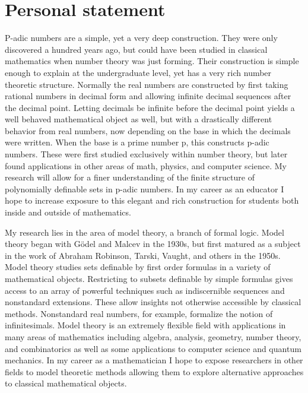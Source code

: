 \documentclass[11pt]{article}
\begin{document}
\section*{Personal statement}

P-adic numbers are a simple, yet a very deep construction. They were only discovered a hundred years ago, but could have been studied in classical mathematics when number theory was just forming. Their construction is simple enough to explain at the undergraduate level, yet has a very rich number theoretic structure. Normally the real numbers are constructed by first taking rational numbers in decimal form and allowing infinite decimal sequences after the decimal point. 
Letting decimals be infinite before the decimal point yields a well behaved mathematical object as well, but with a drastically different behavior from real numbers, now depending on the base in which the decimals were written. 
When the base is a prime number p, this constructs p-adic numbers. These were first studied exclusively within number theory, but later
			 found applications in other areas of math, 
			physics, and computer science. My research 
			will allow 
			for a finer understanding of the finite structure 
		of polynomially definable sets in p-adic numbers. 
			In my career as an educator I hope to increase exposure to this elegant and rich construction for students both inside and outside of mathematics.
		
	
My research lies in the area of model theory, a branch of formal logic. Model theory began with G\"odel and Malcev in the 1930s, but first matured as a subject in the work of Abraham Robinson, Tarski, Vaught, and others in the 1950s. Model theory studies sets definable by first order formulas in a variety of mathematical objects. Restricting to subsets definable by simple formulas gives access to an array of powerful techniques such as indiscernible sequences and nonstandard extensions. These allow insights not otherwise accessible by classical methods. Nonstandard real numbers, for example, formalize the notion of infinitesimals. Model theory is an extremely flexible field with applications in many areas of mathematics including algebra, analysis, geometry, number theory, and combinatorics as well as some applications to computer science and quantum mechanics. In my career as a mathematician I hope to expose researchers in other fields to model theoretic methods allowing them to explore alternative approaches to classical mathematical objects.
\end{document}
